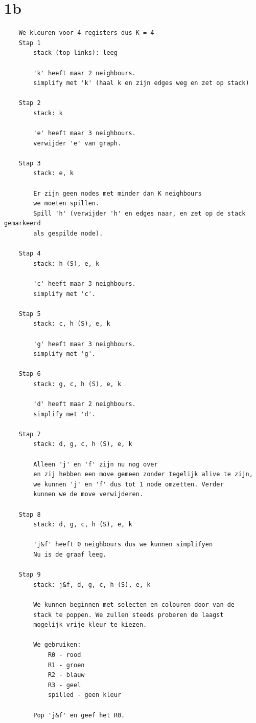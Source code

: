 \documentclass[10pt,a4paper]{article}
\begin{document}
\section*{1b}
\begin{verbatim}
    We kleuren voor 4 registers dus K = 4
    Stap 1
        stack (top links): leeg

        'k' heeft maar 2 neighbours.
        simplify met 'k' (haal k en zijn edges weg en zet op stack)

    Stap 2
        stack: k

        'e' heeft maar 3 neighbours.
        verwijder 'e' van graph.

    Stap 3
        stack: e, k

        Er zijn geen nodes met minder dan K neighbours
        we moeten spillen.
        Spill 'h' (verwijder 'h' en edges naar, en zet op de stack gemarkeerd
        als gespilde node).

    Stap 4
        stack: h (S), e, k

        'c' heeft maar 3 neighbours.
        simplify met 'c'.

    Stap 5
        stack: c, h (S), e, k

        'g' heeft maar 3 neighbours.
        simplify met 'g'.

    Stap 6
        stack: g, c, h (S), e, k

        'd' heeft maar 2 neighbours.
        simplify met 'd'.

    Stap 7
        stack: d, g, c, h (S), e, k

        Alleen 'j' en 'f' zijn nu nog over
        en zij hebben een move gemeen zonder tegelijk alive te zijn,
        we kunnen 'j' en 'f' dus tot 1 node omzetten. Verder
        kunnen we de move verwijderen.

    Stap 8
        stack: d, g, c, h (S), e, k

        'j&f' heeft 0 neighbours dus we kunnen simplifyen
        Nu is de graaf leeg.

    Stap 9
        stack: j&f, d, g, c, h (S), e, k

        We kunnen beginnen met selecten en colouren door van de
        stack te poppen. We zullen steeds proberen de laagst
        mogelijk vrije kleur te kiezen.

        We gebruiken:
            R0 - rood
            R1 - groen
            R2 - blauw
            R3 - geel
            spilled - geen kleur

        Pop 'j&f' en geef het R0.


\end{verbatim}
\end{document}
